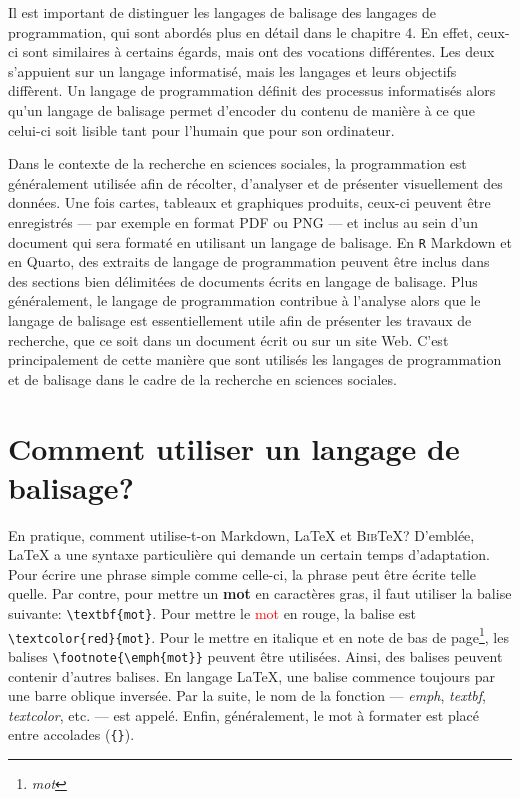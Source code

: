 \documentclass[
  letterpaper,
  DIV=11,
  numbers=noendperiod]{scrreprt}
\begin{document}
Il est important de distinguer les langages de balisage des langages de
programmation, qui sont abordés plus en détail dans le chapitre 4. En
effet, ceux-ci sont similaires à certains égards, mais ont des vocations
différentes. Les deux s'appuient sur un langage informatisé, mais les
langages et leurs objectifs diffèrent. Un langage de programmation
définit des processus informatisés alors qu'un langage de balisage
permet d'encoder du contenu de manière à ce que celui-ci soit lisible
tant pour l'humain que pour son ordinateur.

Dans le contexte de la recherche en sciences sociales, la programmation
est généralement utilisée afin de récolter, d'analyser et de présenter
visuellement des données. Une fois cartes, tableaux et graphiques
produits, ceux-ci peuvent être enregistrés --- par exemple en format PDF
ou PNG --- et inclus au sein d'un document qui sera formaté en utilisant
un langage de balisage. En \texttt{R} Markdown et en Quarto, des
extraits de langage de programmation peuvent être inclus dans des
sections bien délimitées de documents écrits en langage de balisage.
Plus généralement, le langage de programmation contribue à l'analyse
alors que le langage de balisage est essentiellement utile afin de
présenter les travaux de recherche, que ce soit dans un document écrit
ou sur un site Web. C'est principalement de cette manière que sont
utilisés les langages de programmation et de balisage dans le cadre de
la recherche en sciences sociales.

\section{Comment utiliser un langage de
balisage?}\label{comment-utiliser-un-langage-de-balisage}

En pratique, comment utilise-t-on Markdown, LaTeX et \textsc{Bib}TeX?
D'emblée, LaTeX a une syntaxe particulière qui demande un certain temps
d'adaptation. Pour écrire une phrase simple comme celle-ci, la phrase
peut être écrite telle quelle. Par contre, pour mettre un \textbf{mot}
en caractères gras, il faut utiliser la balise suivante:
\texttt{\textbackslash{}textbf\{mot\}}. Pour mettre le
\textcolor{red}{mot} en rouge, la balise est
\texttt{\textbackslash{}textcolor\{red\}\{mot\}}. Pour le mettre en
italique et en note de bas de page\footnote{\emph{mot}}, les balises
\texttt{\textbackslash{}footnote\{\textbackslash{}emph\{mot\}\}} peuvent
être utilisées. Ainsi, des balises peuvent contenir d'autres balises. En
langage LaTeX, une balise commence toujours par une barre oblique
inversée. Par la suite, le nom de la fonction --- \emph{emph},
\emph{textbf}, \emph{textcolor}, etc. --- est appelé. Enfin,
généralement, le mot à formater est placé entre accolades
(\texttt{\{\}}).
\end{document}
